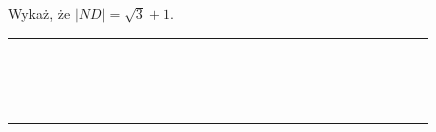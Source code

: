 \documentclass[10pt]{article}
\begin{document}
Wykaż, że \(|N D|=\sqrt{3}+1\).

\begin{center}
\begin{tabular}{|c|c|c|c|c|c|c|c|c|c|c|c|c|c|c|c|c|c|c|c|c|c|c|c|c|c|c|c|c|c|}
\hline
 &  &  &  &  &  &  &  &  &  &  &  &  &  &  &  &  &  &  &  &  &  &  &  &  &  &  &  &  &  \\
\hline
 &  &  &  &  &  &  &  &  &  &  &  &  &  &  &  &  &  &  &  &  &  &  &  &  &  &  &  &  &  \\
\hline
 &  &  &  &  &  &  &  &  &  &  &  &  &  &  &  &  &  &  &  &  &  &  &  &  &  &  &  &  &  \\
\hline
 &  &  &  &  &  &  &  &  &  &  &  &  &  &  &  &  &  &  &  &  &  &  &  &  &  &  &  &  &  \\
\hline
 &  &  &  &  &  &  &  &  &  &  &  &  &  &  &  &  &  &  &  &  &  &  &  &  &  &  &  &  &  \\
\hline
 &  &  &  &  &  &  &  &  &  &  &  &  &  &  &  &  &  &  &  &  &  &  &  &  &  &  &  &  &  \\
\hline
 &  &  &  &  &  &  &  &  &  &  &  &  &  &  &  &  &  &  &  &  &  &  &  &  &  &  &  &  &  \\
\hline
 &  &  &  &  &  &  &  &  &  &  &  &  &  &  &  &  &  &  &  &  &  &  &  &  &  &  &  &  &  \\
\hline
 &  &  &  &  &  &  &  &  &  &  &  &  &  &  &  &  &  &  &  &  &  &  &  &  &  &  &  &  &  \\
\hline
 &  &  &  &  &  &  &  &  &  &  &  &  &  &  &  &  &  &  &  &  &  &  &  &  &  &  &  &  &  \\
\hline
 &  &  &  &  &  &  &  &  &  &  &  &  &  &  &  &  &  &  &  &  &  &  &  &  &  &  &  &  &  \\
\hline
 &  &  &  &  &  &  &  &  &  &  &  &  &  &  &  &  &  &  &  &  &  &  &  &  &  &  &  &  &  \\
\hline
 &  &  &  &  &  &  &  &  &  &  &  &  &  &  &  &  &  &  &  &  &  &  &  &  &  &  &  &  &  \\
\hline
 &  &  &  &  &  &  &  &  &  &  &  &  &  &  &  &  &  &  &  &  &  &  &  &  &  &  &  &  &  \\
\hline
 &  &  &  &  &  &  &  &  &  &  &  &  &  &  &  &  &  &  &  &  &  &  &  &  &  &  &  &  &  \\
\hline
 &  &  &  &  &  &  &  &  &  &  &  &  &  &  &  &  &  &  &  &  &  &  &  &  &  &  &  &  &  \\
\hline
 &  &  &  &  &  &  &  &  &  &  &  &  &  &  &  &  &  &  &  &  &  &  &  &  &  &  &  &  &  \\
\hline

\end{tabular}
\end{center}
\end{document}
